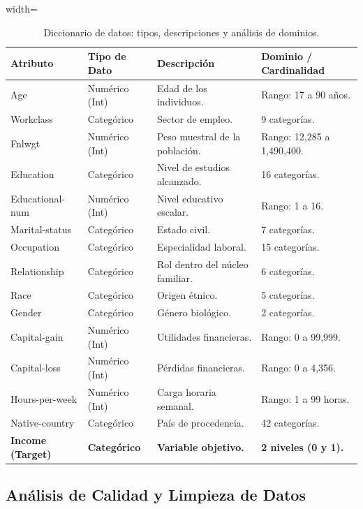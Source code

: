 \documentclass[a4paper,10pt]{book}
\begin{document}
		\begin{table}[H]
			\centering
			\begin{adjustbox}{width=\textwidth}
				\begin{tabular}{@{}llll@{}}
					\toprule
					\textbf{Atributo} & \textbf{Tipo de Dato} & \textbf{Descripción} & \textbf{Dominio / Cardinalidad} \\ \midrule
					Age & Numérico (Int) & Edad de los individuos. & Rango: 17 a 90 años. \\
					Workclass & Categórico & Sector de empleo. & 9 categorías. \\
					Fnlwgt & Numérico (Int) & Peso muestral de la población. & Rango: 12,285 a 1,490,400. \\
					Education & Categórico & Nivel de estudios alcanzado. & 16 categorías. \\
					Educational-num & Numérico (Int) & Nivel educativo escalar. & Rango: 1 a 16. \\
					Marital-status & Categórico & Estado civil. & 7 categorías. \\
					Occupation & Categórico & Especialidad laboral. & 15 categorías. \\
					Relationship & Categórico & Rol dentro del núcleo familiar. & 6 categorías. \\
					Race & Categórico & Origen étnico. & 5 categorías. \\
					Gender & Categórico & Género biológico. & 2 categorías. \\
					Capital-gain & Numérico (Int) & Utilidades financieras. & Rango: 0 a 99,999. \\
					Capital-loss & Numérico (Int) & Pérdidas financieras. & Rango: 0 a 4,356. \\
					Hours-per-week & Numérico (Int) & Carga horaria semanal. & Rango: 1 a 99 horas. \\
					Native-country & Categórico & País de procedencia. & 42 categorías. \\
					\rowcolor{TNcolor}
					\textbf{Income (Target)} & \textbf{Categórico} & \textbf{Variable objetivo.} & \textbf{2 niveles (0 y 1).} \\ \bottomrule
				\end{tabular}
			\end{adjustbox}
			\caption{Diccionario de datos: tipos, descripciones y análisis de dominios.}
			\label{tab:atributos}
		\end{table}
	
	\subsection{Análisis de Calidad y Limpieza de Datos}
	
\end{document}
